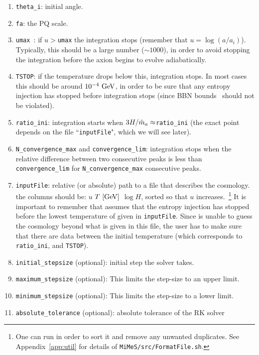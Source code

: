 \documentclass[11pt,a4paper]{article}
\begin{document}
\begin{enumerate}
	\item {\tt theta\_i}: initial angle.
	\item {\tt fa}: the PQ scale.
	\item {\tt umax }: if $u>${\tt umax} the integration stops (remember that $u=\log(a/a_i)$). Typically, this should be a large number ($\sim 1000$), in order to avoid stopping the integration before the axion begins to evolve  adiabatically.    
	\item {\tt TSTOP}: if the temperature drops below this, integration stops. In most cases this should be around 
	$10^{-4}~{\rm GeV}$, in order to be sure that any entropy injection has stopped before integration stops (since BBN bounds~\cite{Kolb:206230,Peebles:1993} should not be violated).
	\item {\tt ratio\_ini}: integration starts when $3H/\tilde m_{a}{} \approx${\tt ratio\_ini} (the exact point depends on the file ``{\tt inputFile}", which we will see later). 
	\item  {\tt N\_convergence\_max} and {\tt convergence\_lim}: integration stops when the relative difference 
	between two consecutive peaks is less than {\tt convergence\_lim} for {\tt N\_convergence\_max} 
	consecutive peaks.
	\item  {\tt inputFile}: relative (or absolute) path to a file that describes the cosmology. the columns should be: $u$ $T ~[{\rm GeV}]$ $\log H$, sorted so that $u$ increases.~\footnote{One can run  in order to sort it and remove any unwanted duplicates. See Appendix~\ref{app:util} for details of {\tt MiMeS/src/FormatFile.sh}.}
	It is important to remember that \mimes assumes that the entropy injection has stopped before the lowest temperature of given in {\tt inputFile}. Since \mimes is unable to guess the cosmology beyond what is given in this file, the user has to make sure that there are data between the initial temperature (which corresponds to {\tt ratio\_ini}, and {\tt TSTOP}).
	
	\item {\tt initial\_stepsize} (optional): initial step the solver takes. 
	
	\item {\tt maximum\_stepsize} (optional): This limits the step-size to an upper limit. 
	\item {\tt minimum\_stepsize} (optional): This limits the step-size to a lower limit. 
	
	\item {\tt absolute\_tolerance} (optional): absolute tolerance of the RK solver
	

\end{enumerate}
\end{document}
